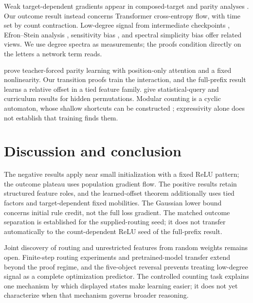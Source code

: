 Weak target-dependent gradients appear in composed-target and parity analyses
\citep{shalevshwartz2017failures,abbe2021staircase,abbe2022mergedstaircase,abbe2023sgd,abbe2025parities}.
Our outcome result instead concerns Transformer cross-entropy flow, with time set by count contraction.
Low-degree signal from intermediate checkpoints \citep{panigrahi2025progressive}, Efron--Stein
analysis \citep{li2025noise}, sensitivity bias \citep{hahn2024sensitive}, and spectral simplicity
bias \citep{yang2019spectral} offer related views. We use degree spectra as measurements;
the proofs condition directly on the letters a network term reads.

\citet{kim2024parity} prove teacher-forced parity learning with position-only attention and a fixed
nonlinearity. Our transition proofs train the interaction, and the full-prefix result learns a
relative offset in a tied feature family. \citet{wang2025compositional} give statistical-query
and curriculum results for hidden permutations. Modular counting is a cyclic automaton,
whose shallow shortcuts can be constructed \citep{liu2023automata}; expressivity alone does
not establish that training finds them.

\section{Discussion and conclusion}
\label{sec:conclusion}
\label{sec:discussion}

The negative results apply near small initialization with a fixed ReLU pattern; the outcome
plateau uses population gradient flow. The positive results retain structured feature roles,
and the learned-offset theorem additionally uses tied factors and target-dependent fixed
mobilities. The Gaussian lower bound concerns initial rule credit, not the full loss gradient.
The matched outcome separation is established for the supplied-routing seed; it does not
transfer automatically to the count-dependent ReLU seed of the full-prefix result.

Joint discovery of routing and unrestricted features from random weights remains open.
Finite-step routing experiments and pretrained-model transfer extend beyond the proof regime,
and the five-object reversal prevents treating low-degree signal as a complete optimization
predictor. The controlled counting task explains one mechanism by which displayed states
make learning easier; it does not yet characterize when that mechanism governs broader reasoning.
